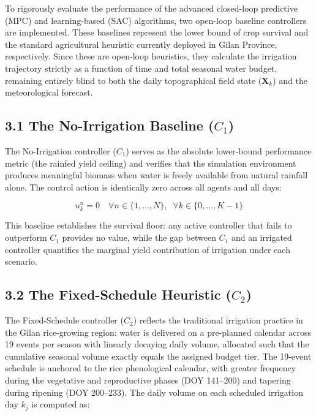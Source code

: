 To rigorously evaluate the performance of the advanced closed-loop
predictive (MPC) and learning-based (SAC) algorithms, two open-loop
baseline controllers are implemented. These baselines represent the
lower bound of crop survival and the standard agricultural heuristic
currently deployed in Gilan Province, respectively. Since these are
open-loop heuristics, they calculate the irrigation trajectory strictly
as a function of time and total seasonal water budget, remaining
entirely blind to both the daily topographical field state
(\(\mathbf{X}_k\)) and the meteorological forecast.

\subsection{\texorpdfstring{3.1 The No-Irrigation Baseline
(\(C_1\))}{3.1 The No-Irrigation Baseline (C\_1)}}\label{the-no-irrigation-baseline-c_1}

The No-Irrigation controller (\(C_1\)) serves as the absolute
lower-bound performance metric (the rainfed yield ceiling) and verifies
that the simulation environment produces meaningful biomass when water
is freely available from natural rainfall alone. The control action is
identically zero across all agents and all days:

\[u_k^n = 0 \quad \forall n \in \{1, \ldots, N\}, \;\; \forall k \in \{0, \ldots, K-1\} \tag{7}\]

This baseline establishes the survival floor: any active controller that
fails to outperform \(C_1\) provides no value, while the gap between
\(C_1\) and an irrigated controller quantifies the marginal yield
contribution of irrigation under each scenario.

\subsection{\texorpdfstring{3.2 The Fixed-Schedule Heuristic
(\(C_2\))}{3.2 The Fixed-Schedule Heuristic (C\_2)}}\label{the-fixed-schedule-heuristic-c_2}

The Fixed-Schedule controller (\(C_2\)) reflects the traditional
irrigation practice in the Gilan rice-growing region: water is delivered
on a pre-planned calendar across 19 events per season with linearly
decaying daily volume, allocated such that the cumulative seasonal
volume exactly equals the assigned budget tier. The 19-event schedule is
anchored to the rice phenological calendar, with greater frequency
during the vegetative and reproductive phases (DOY 141--200) and
tapering during ripening (DOY 200--233). The daily volume on each
scheduled irrigation day \(k_j\) is computed as:

